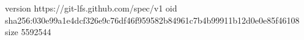 version https://git-lfs.github.com/spec/v1
oid sha256:030e99a1e4dcf326e9c76df46f959582b84961c7b4b99911b12d0e0e85f46108
size 5592544
